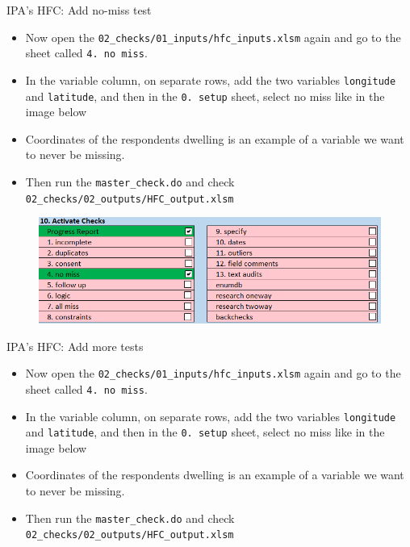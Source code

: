 \documentclass[aspectratio=169]{beamer}
\begin{document}
\begin{frame}{IPA's HFC: Add no-miss test}

	\begin{itemize}
		\item \small Now open the \texttt{02\_checks/01\_inputs/hfc\_inputs.xlsm} again and go to the sheet called \texttt{4. no miss}.
		\item \small In the variable column, on separate rows, add the two variables \texttt{longitude} and \texttt{latitude}, and then in the \texttt{0. setup} sheet, select no miss like in the image below
		\item \small Coordinates of the respondents dwelling is an example of a variable we want to never be missing.
		\item \small Then run the \texttt{master\_check.do} and check \texttt{02\_checks/02\_outputs/HFC\_output.xlsm} 
	\end{itemize}

	\begin{figure}
		\centering
		\includegraphics[width=.75\linewidth]{img/ipacheck-setup-nomiss.png}
	\end{figure}
\end{frame}

\begin{frame}{IPA's HFC: Add more tests}
	\begin{itemize}
		\item \small Now open the \texttt{02\_checks/01\_inputs/hfc\_inputs.xlsm} again and go to the sheet called \texttt{4. no miss}.
		\item \small In the variable column, on separate rows, add the two variables \texttt{longitude} and \texttt{latitude}, and then in the \texttt{0. setup} sheet, select no miss like in the image below
		\item \small Coordinates of the respondents dwelling is an example of a variable we want to never be missing.
		\item \small Then run the \texttt{master\_check.do} and check \texttt{02\_checks/02\_outputs/HFC\_output.xlsm} 
	\end{itemize}
\end{frame}
\end{document}
